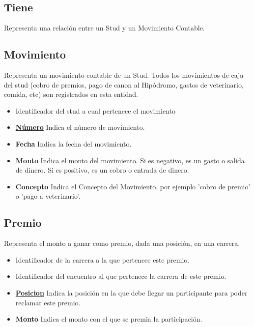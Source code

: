 \documentclass[a4paper,11pt]{article}
\begin{document}
\subsection{Tiene}

Representa una relación entre un Stud y un Movimiento Contable.

\subsection{Movimiento}

Representa un movimiento contable de un Stud. Todos los movimientos de caja
del stud (cobro de premios, pago de canon al Hipódromo, gastos de veterinario, 
comida, etc) son registrados en esta entidad.

\begin{itemize}

  \item \textbf{\uline{}} Identificador del stud a cual pertenece el movimiento

  \item \textbf{\uline{Número}} Indica el número de movimiento.

  \item \textbf{Fecha} Indica la fecha del movimiento.

  \item \textbf{Monto} Indica el monto del movimiento. Si es negativo, es un 
  gasto o salida de dinero. Si es positivo, es un cobro o entrada de dinero.

  \item \textbf{Concepto} Indica el Concepto del Movimiento, por ejemplo 
  'cobro de premio' o 'pago a veterinario'.
      
\end{itemize}

\subsection{Premio}

Representa el monto a ganar como premio, dada una posición, en una carrera.

\begin{itemize}

  \item \textbf{\uline{}} Identificador de la carrera
    a la que pertenece este premio.

  \item \textbf{\uline{}} Identificador del
    encuentro al que pertenece la carrera de este premio.

  \item \textbf{\uline{Posicion}} Indica la posición en la que debe llegar un
    participante para poder reclamar este premio.

  \item \textbf{Monto} Indica el monto con el que se premia la participación.

\end{itemize}
\end{document}
